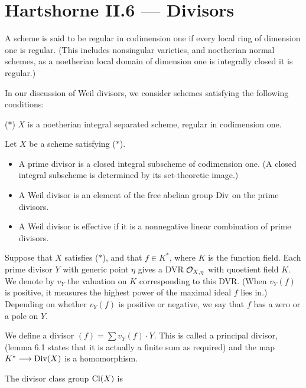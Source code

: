 \documentclass[11pt]{article}
\newcommand{\indexThm}[1]{\index{Hartshorne!Theorems, etc.!#1}}
\begin{document}
\section*{Hartshorne II.6 --- Divisors}
\begin{itemise}
\item A scheme is said to be regular in
codimension one if every local ring of dimension one is regular. {\small (This
includes nonsingular varieties, and noetherian normal schemes, as a noetherian
local domain of dimension one is integrally closed \Iff it is regular.)}
\item In our discussion of Weil divisors, we consider schemes satisfying the
following conditions:
\begin{itemise}
\item[($*$)] $X$ is a noetherian integral separated scheme, regular in
codimension one.
\end{itemise}
\item Let $X$ be a scheme satisfying ($*$). 
\begin{itemize}\squishlist
\item A prime divisor is a closed integral subscheme of
codimension one. {\small (A closed integral subscheme is determined by its
set-theoretic image.)}
\item A  Weil divisor is an element of the free abelian
group $\textup{Div}$ on the prime divisors.
\item A Weil divisor is effective  if it is a
nonnegative linear combination of prime divisors.
\end{itemize}
\item Suppose that $X$ satisfies ($*$), and that $f\in K^*$, where $K$ is the
function field. Each prime divisor $Y$ with generic point $\eta$ gives a DVR
$\mathcal{O}_{X,\eta}$ with quoetient field $K$. We denote by $v_Y$ the valuation on
$K$ corresponding to this DVR. {\small (When $v_Y(f)$ is positive, it measures
the highest power of the maximal ideal $f$ lies in.)} Depending on whether
$v_Y(f)$ is positive or negative, we say that $f$ has a zero or a pole on $Y$.
\item We define a divisor $(f)=\sum v_Y(f)\cdot Y$. This is called a
 principal divisor, {\small (lemma 6.1\indexThm{II.6.1}
states that it is actually a finite sum as required)} and the map
$K^*\longrightarrow\textup{Div}(X)$ is a homomorphism.
\item The divisor class group $\textup{Cl}(X)$ is

\end{itemise}
\end{document}
